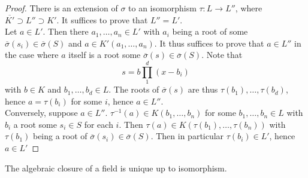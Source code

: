     \begin{proof}
        There is an extension of $\sigma$ to an isomorphism $\tau:L\rightarrow L''$, where $\overline{K'} \supset L''\supset K'$. It suffices to prove that $L''=L'$.\\ Let $a\in L'$. Then there $a_1,\dots,a_n\in L'$ with $a_i$ being a root of some $\overline{\sigma}(s_i)\in \overline{\sigma}(S)$ and $a\in K'(a_1,\dots,a_n)$. It thus suffices to prove that $a\in L''$ in the case where $a$ itself is a root some $\overline{\sigma}(s)\in \overline{\sigma}(S)$. Note that
        $$
            s = b \prod_1^d (x-b_i)
        $$
        with $b\in K$ and $b_1,\dots,b_d\in L$. The roots of $\overline{\sigma}(s)$ are thus $\tau(b_1),\dots,\tau(b_d)$, hence $a = \tau(b_i)$ for some $i$, hence $a\in L''$.\\
        Conversely, suppose $a\in L''$. $\tau^{-1}(a)\in K(b_1,\dots,b_n)$ for some $b_1,\dots,b_n\in L$ with $b_i$ a root some $s_i\in S$ for each $i$. Then $\tau(a)\in K(\tau(b_1),\dots,\tau(b_n))$ with $\tau(b_1)$ being a root of $\overline{\sigma}(s_i)\in \overline{\sigma}(S)$. Then in particular $\tau(b_i)\in L'$, hence $a\in L'$ 
    \end{proof}

    \begin{corollary}
        The algebraic closure of a field is unique up to isomorphism. 
    \end{corollary}
